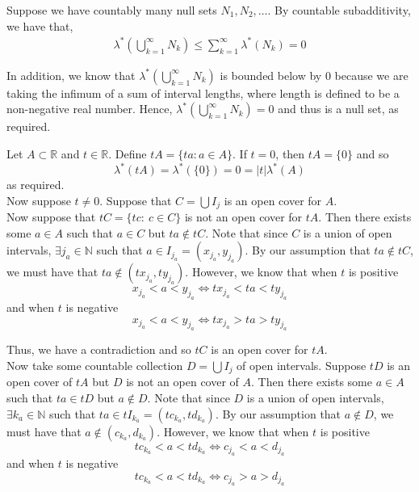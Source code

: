 \documentclass[12pt]{article}
\newenvironment{problem}[2][Problem]{\begin{trivlist}
\item[\hskip \labelsep {\bfseries #1}\hskip \labelsep {\bfseries #2.}]}{\end{trivlist}}
\begin{document}
\begin{problem}{7}
\end{problem}

Suppose we have countably many null sets $N_1, N_2, \ldots$. By countable subadditivity, we have that,
\begin{align*}
\lambda^*\left(\bigcup_{k=1}^{\infty} N_k\right) \leq \sum_{k=1}^{\infty} \lambda^*(N_k) = 0
\end{align*}

In addition, we know that $\lambda^*\left(\bigcup_{k=1}^{\infty} N_k\right)$ is bounded below by $0$ because we are taking the infimum of a sum of interval lengths, where length is defined to be a non-negative real number. Hence, $\lambda^*\left(\bigcup_{k=1}^{\infty} N_k\right) = 0$ and thus is a null set, as required.

\begin{problem}{8}
\end{problem}

Let $A \subset \mathbb{R}$ and $t \in \mathbb{R}$. Define $tA = \{ta: a \in A\}$. If $t = 0$, then $tA = \{0\}$ and so $$\lambda^*(tA) = \lambda^*(\{0\}) = 0 = |t|\lambda^*(A)$$ as required.\\

Now suppose $t \neq 0$. Suppose that $C = \bigcup I_j$ is an open cover for $A$.\\

Now suppose that $tC = \{tc: \ c \in C\}$ is not an open cover for $tA$. Then there exists some $a \in A$ such that $a \in C$ but $ta \not\in tC$. Note that since $C$ is a union of open intervals, $\exists j_a \in \mathbb{N}$ such that $a \in I_{j_a} = (x_{j_a}, y_{j_a})$. By our assumption that $ta \not\in tC$, we must have that $ta \not\in (tx_{j_a}, ty_{j_a} )$. However, we know that when $t$ is positive $$x_{j_a} < a < y_{j_a} \iff tx_{j_a} < ta < ty_{j_a}$$ and when $t$ is negative $$x_{j_a} < a < y_{j_a} \iff tx_{j_a} > ta > ty_{j_a}$$

Thus, we have a contradiction and so $tC$ is an open cover for $tA$.\\

Now take some countable collection $D = \bigcup I_j$ of open intervals. Suppose $tD$ is an open cover of $tA$ but $D$ is not an open cover of $A$. Then there exists some $a \in A$ such that $ta \in tD$ but $a \not\in D$. Note that since $D$ is a union of open intervals, $\exists k_a \in \mathbb{N}$ such that $ta \in tI_{k_a} = (tc_{k_a}, td_{k_a})$. By our assumption that $a \not\in D$, we must have that $a \not\in (c_{k_a}, d_{k_a})$. However, we know that when $t$ is positive $$tc_{k_a} < a < td_{k_a} \iff c_{j_a} < a < d_{j_a}$$ and when $t$ is negative $$tc_{k_a} < a < td_{k_a} \iff c_{j_a} > a > d_{j_a}$$
 
\end{document}
